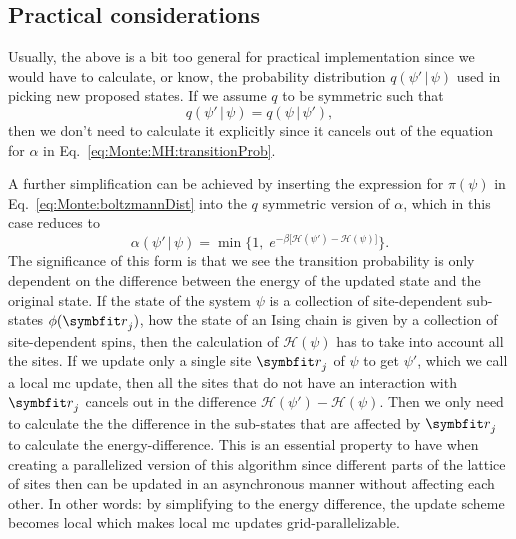 \subsection{Practical considerations}

Usually, the above is a bit too general for practical implementation since we would have to calculate, or know, the probability
distribution $q(\psi'\,|\,\psi)$ used in picking new proposed states. If we assume $q$ to be symmetric such that
\begin{equation}
    \label{eq:Monte:MH:pickDistributionSymmetry}
    q(\psi'\,|\,\psi) = q(\psi\,|\,\psi'),
\end{equation}
then we don't need to calculate it explicitly since it cancels out of the equation for $\alpha$ in Eq.~\eqref{eq:Monte:MH:transitionProb}.

A further simplification can be achieved by inserting the expression for $\pi(\psi)$ in Eq.~\eqref{eq:Monte:boltzmannDist} into the $q$
symmetric version of $\alpha$, which in this case reduces to
\begin{equation}
    \label{eq:Monte:MH:reducedTransitionProb}
    \alpha(\psi'\,|\,\psi) = \min\Big\{1,\;e^{-\beta\big[\mathcal{H}(\psi') - \mathcal{H}(\psi)\big]}\Big\}.
\end{equation}
The significance of this form is that we see the transition probability is only dependent on the difference between the energy of the
updated state and the original state. If the state of the system $\psi$ is a collection of site-dependent sub-states $\phi(\v{r}_j)$,
\eg how the state of an Ising chain is given by a collection of site-dependent spins, then the calculation of $\mathcal{H}(\psi)$
has to take into account all the sites. If we update only a single site $\v{r}_j$ of $\psi$ to get $\psi'$, which we call a local
\ac{mc} update, then all the sites that do not have an interaction with $\v{r}_j$ cancels out in the
difference $\mathcal{H}(\psi')-\mathcal{H}(\psi)$. Then we only need to calculate the the difference in the sub-states that are
affected by $\v{r}_j$ to calculate the energy-difference. This is an essential property to have when creating a parallelized version
of this algorithm since different parts of the lattice of sites then can be updated in an asynchronous manner without affecting
each other. In other words: by simplifying to the energy difference, the update scheme becomes local which makes local \ac{mc}
updates grid-parallelizable.

